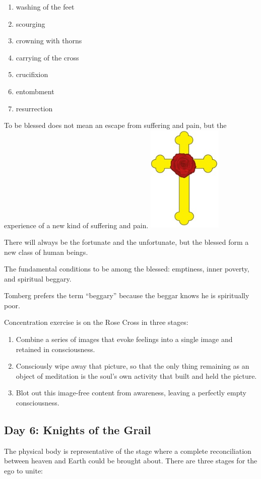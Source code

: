 \begin{enumerate}
\item washing of the feet 
\item scourging 
\item crowning with thorns 
\item carrying of the cross 
\item crucifixion 
\item entombment 
\item resurrection 
\end{enumerate}
To be blessed does not mean an escape from suffering and pain, but the experience of a new kind of suffering and pain.
\includegraphics[width=3.577cm,height=5.122cm]{a20230305OurFatherCourseWeek4-img001.jpg} 

There will always be the fortunate and the unfortunate, but the blessed form a new class of human beings.

The fundamental conditions to be among the blessed: emptiness, inner poverty, and spiritual beggary.

Tomberg prefers the term “beggary” because the beggar knows he is spiritually poor.

Concentration exercise is on the Rose Cross in three stages:

\begin{enumerate}
\item Combine a series of images that evoke feelings into a single image and retained in consciousness. 
\item Consciously wipe away that picture, so that the only thing remaining as an object of meditation is the
soul's own activity that built and held the picture. 
\item Blot out this image-free content from awareness, leaving a perfectly empty consciousness. 
\end{enumerate}

\subsection*{Day 6: Knights of the Grail}
The physical body is representative of the stage where a complete reconciliation between heaven and Earth could be
brought about. There are three stages for the ego to unite:

